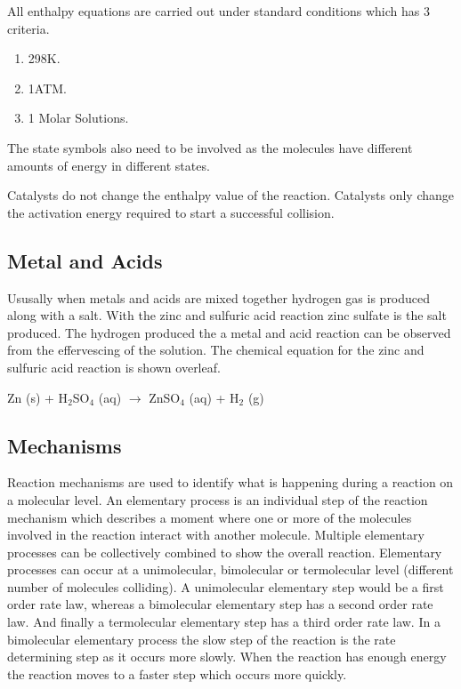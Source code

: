 All enthalpy equations are carried out under standard conditions which has 3 criteria.

\begin{enumerate}
\item 298K.
\item 1ATM.
\item 1 Molar Solutions.
\end{enumerate}

The state symbols also need to be involved as the molecules have different amounts of energy in different states. 

Catalysts do not change the enthalpy value of the reaction. Catalysts only change the activation energy required to start a successful collision.




	
	


	\subsection{Metal and Acids}

Ususally when metals and acids are mixed together hydrogen gas is produced along with a salt. With the zinc and sulfuric acid reaction zinc sulfate is the salt produced. The hydrogen produced the a metal and acid reaction can be observed from the effervescing of the solution. The chemical equation for the zinc and sulfuric acid reaction is shown overleaf.

Zn (s) + H$_2$SO$_4$ (aq) $\rightarrow$ ZnSO$_4$ (aq) + H$_2$ (g)




	\subsection{Mechanisms}

Reaction mechanisms are used to identify what is happening during a reaction on a molecular level. An elementary process is an individual step of the reaction mechanism which describes a moment where one or more of the molecules involved in the reaction interact with another molecule. Multiple elementary processes can be collectively combined to show the overall reaction. Elementary processes can occur at a unimolecular, bimolecular or termolecular level (different number of molecules colliding). A unimolecular elementary step would be a first order rate law, whereas a bimolecular elementary step has a second order rate law. And finally a termolecular elementary step has a third order rate law. In a bimolecular elementary process the slow step of the reaction is the rate determining step as it occurs more slowly. When the reaction has enough energy the reaction moves to a faster step which occurs more quickly.

